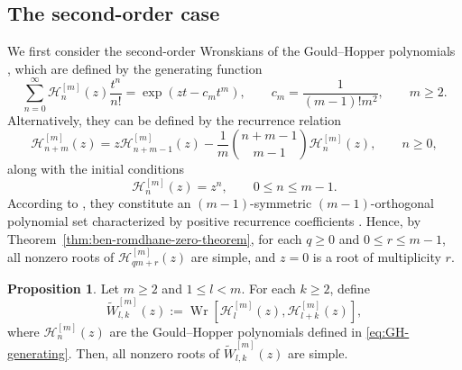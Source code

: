 \documentclass[preprint,3p,10pt]{elsarticle}
\theoremstyle{definition}
\newtheorem{proposition}[definition]{Proposition}
\begin{document}
\subsection{The second-order case}
We first consider the second-order Wronskians of the Gould--Hopper polynomials \cite{GouldHopper1962}, which are defined by the generating function 
\begin{equation}\label{eq:GH-generating}
    \sum_{n=0}^{\infty}\mathcal H_n^{[m]}(z)\frac{t^n}{n!}
    =
    \exp\left(zt-c_m t^m\right),
    \qquad
    c_m=\frac{1}{(m-1)!m^2}, \qquad m\ge2.
\end{equation}
Alternatively, they can be defined by the recurrence relation \cite{GouldHopper1962}
\begin{equation}
    \mathcal H_{n+m}^{[m]}(z)
    =
    z\mathcal H_{n+m-1}^{[m]}(z)
    -
    \frac{1}{m}\binom{n+m-1}{m-1}\mathcal H_n^{[m]}(z),
    \qquad n\geq0,
\end{equation}
along with the initial conditions
\begin{equation}
    \mathcal H_n^{[m]}(z)=z^n,
    \qquad 0\leq n\leq m-1.
\end{equation} 
According to \cite{douak1995relation}, they constitute an $(m-1)$-symmetric $(m-1)$-orthogonal polynomial set characterized by positive recurrence coefficients \cite{romdhane2008zeros}. 
Hence, by Theorem~\ref{thm:ben-romdhane-zero-theorem}, for each
\(q\ge 0\) and \(0\le r\le m-1\), all nonzero roots of
\(\mathcal H_{qm+r}^{[m]}(z)\) are simple, and \(z=0\) is a root of multiplicity \(r\).

\begin{proposition}\label{prop:GH-Wronskian}
Let \(m\ge2\) and \(1\le l<m\).  For each \(k\ge2\), define
\begin{equation}
    \widetilde W_{l,k}^{[m]}(z):= \operatorname{Wr}\!\left[\mathcal H_l^{[m]}(z),\mathcal H_{l+k}^{[m]}(z)\right],
\end{equation}
where $\mathcal H_n^{[m]}(z)$ are the Gould--Hopper polynomials defined in \eqref{eq:GH-generating}. Then, all nonzero roots of $\widetilde W_{l,k}^{[m]}(z)$ are simple.
\end{proposition}
\end{document}

